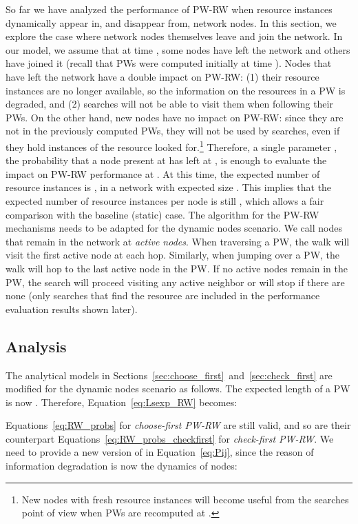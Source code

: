 \documentclass[]{elsarticle}
\begin{document}
So far we have analyzed the performance of PW-RW when resource instances dynamically appear in, and disappear from, network nodes. In this section, we explore the case where network nodes themselves leave and join the network. In our model, we assume that at time , some nodes have left the network and others have joined it (recall that PWs were computed initially at time ).  Nodes that have left the network have a double impact on PW-RW: (1) their resource instances are no longer available, so the information on the resources in a PW is degraded, and (2) searches will not be able to visit them when following their PWs. On the other hand, new nodes have no impact on PW-RW: since they are not in the previously computed PWs, they will not be used by searches, even if they hold instances of the resource looked for.\footnote{New nodes with fresh resource instances will become useful from the searches point of view when PWs are recomputed at .} Therefore, a single parameter , the probability that a node present at  has left at , is enough to evaluate the impact on PW-RW performance at . At this time, the expected number of resource instances is , in a network with expected size . This implies that the expected number of resource instances per node is still , which allows a fair comparison with the baseline (static) case.
The algorithm for the PW-RW mechanisms needs to be adapted for the dynamic nodes scenario. We call nodes that remain in the network at  \emph{active nodes}. When traversing a PW, the walk will visit the first active node at each hop. Similarly, when jumping over a PW, the walk will hop to the last active node in the PW. If no active nodes remain in the PW, the search will proceed visiting any active neighbor or will stop if there are none (only searches that find the resource are included in the performance evaluation results shown later).


\subsection{Analysis}


The analytical models in Sections~\ref{sec:choose_first}~and~\ref{sec:check_first} are modified for the dynamic nodes scenario as follows. 
The expected length of a PW is now . Therefore, Equation~\ref{eq:Lsexp_RW} becomes:

Equations~\ref{eq:RW_probs} for \emph{choose-first PW-RW} are still valid, and so are their counterpart Equations~\ref{eq:RW_probs_checkfirst} for \emph{check-first PW-RW}. We need to provide a new version of  in Equation~\ref{eq:Pij}, since the reason of information degradation is now the dynamics of nodes:
\end{document}
